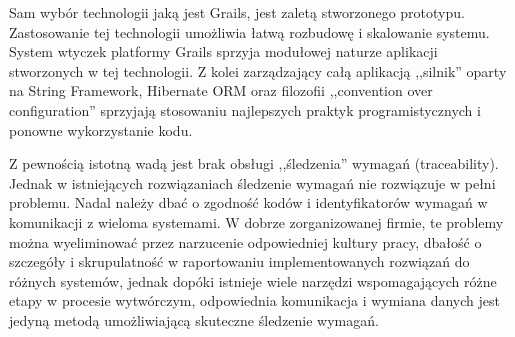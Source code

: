     Sam wybór technologii jaką jest Grails, jest zaletą stworzonego prototypu. Zastosowanie tej technologii umożliwia łatwą rozbudowę i skalowanie systemu. System wtyczek platformy Grails sprzyja modułowej naturze aplikacji stworzonych w tej technologii. Z kolei zarządzający całą aplikacją ,,silnik'' oparty na String Framework, Hibernate ORM oraz filozofii ,,convention over configuration'' sprzyjają stosowaniu najlepszych praktyk programistycznych i ponowne wykorzystanie kodu.

    Z pewnością istotną wadą jest brak obsługi ,,śledzenia'' wymagań (traceability). Jednak w istniejących rozwiązaniach śledzenie wymagań nie rozwiązuje w pełni problemu. Nadal należy dbać o zgodność kodów i identyfikatorów wymagań w komunikacji z wieloma systemami. W dobrze zorganizowanej firmie, te problemy można wyeliminować przez narzucenie odpowiedniej kultury pracy, dbałość o szczegóły i skrupulatność w raportowaniu implementowanych rozwiązań do różnych systemów, jednak dopóki istnieje wiele narzędzi wspomagających różne etapy w procesie wytwórczym, odpowiednia komunikacja i wymiana danych jest jedyną metodą umożliwiającą skuteczne śledzenie wymagań.
